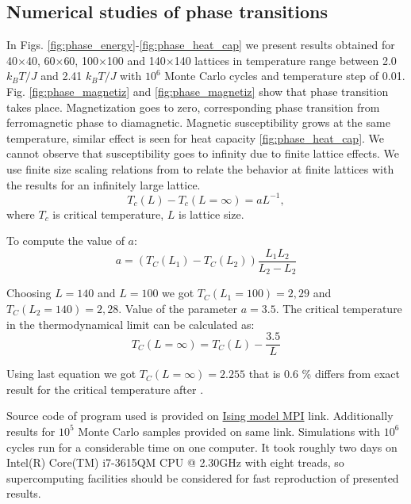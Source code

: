 \documentclass[10pt]{article}
\begin{document}
\newpage

\subsection{Numerical studies of phase transitions}
In Figs. \ref{fig:phase_energy}-\ref{fig:phase_heat_cap} we present results obtained for 40$\times$40, 60$\times$60, 100$\times$100 and 140$\times$140 lattices in temperature range between 2.0 $k_BT/J$ and 2.41 $k_BT/J$ with $10^6$ Monte Carlo cycles and temperature step of 0.01. Fig. \ref{fig:phase_magnetiz} and \ref{fig:phase_magnetiz} show that phase transition takes place. Magnetization goes to zero, corresponding phase transition from ferromagnetic phase to diamagnetic. Magnetic susceptibility grows at the same temperature, similar effect is seen for heat capacity \ref{fig:phase_heat_cap}. We cannot observe that susceptibility goes to infinity due to finite lattice effects.
We use finite size scaling relations from \cite{one} to relate the behavior at finite lattices with the results for
an infinitely large lattice.
\[
T_c(L) - T_c(L = \infty ) = a L^{-1},
\]
where $T_c$ is critical temperature, $L$ is lattice size. 

To compute the value of $a$:
\[
a=(T_C(L_1)-T_C(L_2))\frac{L_1 L_2}{L_2-L_2}
\]


Choosing $L=140$ and $L=100$ we got $T_C(L_1 =100)=2,29$ and $T_C(L_2 =140)=2,28$. Value of the parameter $a=3.5$.
The critical temperature in the thermodynamical limit can be calculated as:
\[
T_C(L=\infty) = T_C(L)-\frac{3.5}{L}
\]

Using last equation we got $T_C(L=\infty)= 2.255$ that is $0.6$ \% differs from exact result for the critical temperature after \cite{Onsager}.



Source code of program used is provided on \href{https://github.com/andrei-fys/fys4150/tree/master/Project_4/src/MPI}{Ising model MPI} link.
Additionally results for $10^5$ Monte Carlo samples provided on same link. Simulations with $10^6$ cycles run for a considerable time on one computer. It took roughly two days on Intel(R) Core(TM) i7-3615QM CPU @ 2.30GHz with eight treads, so supercomputing facilities should be considered for fast reproduction of presented results. 
\end{document}
